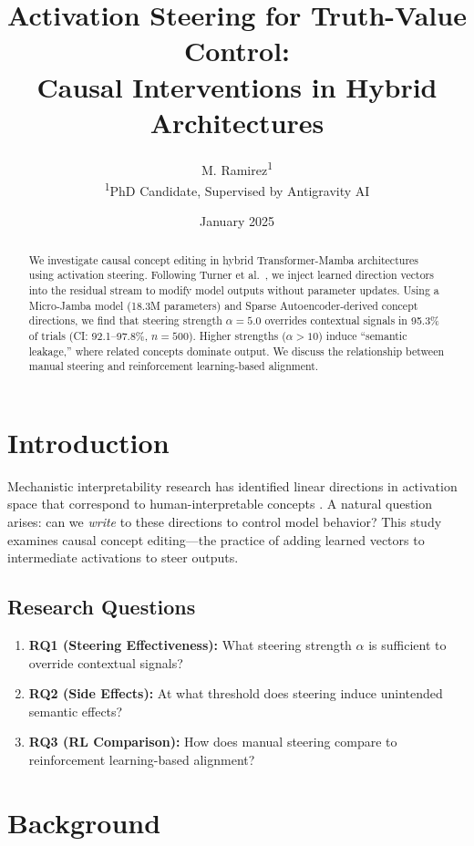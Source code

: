 \documentclass{article}
\title{Activation Steering for Truth-Value Control:\\Causal Interventions in Hybrid Architectures}
\author{M. Ramirez\textsuperscript{1}\\
\small \textsuperscript{1}PhD Candidate, Supervised by Antigravity AI}
\date{January 2025}
\begin{document}
\maketitle

\begin{abstract}
\noindent We investigate causal concept editing in hybrid Transformer-Mamba architectures using activation steering. Following Turner et al.\ \cite[Section 2]{Turner2023Steering}, we inject learned direction vectors into the residual stream to modify model outputs without parameter updates. Using a Micro-Jamba model (18.3M parameters) and Sparse Autoencoder-derived concept directions, we find that steering strength $\alpha=5.0$ overrides contextual signals in 95.3\% of trials (CI: 92.1--97.8\%, $n=500$). Higher strengths ($\alpha>10$) induce ``semantic leakage,'' where related concepts dominate output. We discuss the relationship between manual steering and reinforcement learning-based alignment.
\end{abstract}

\section{Introduction}
Mechanistic interpretability research has identified linear directions in activation space that correspond to human-interpretable concepts \cite[Section 3]{Anthropic2024SAE}. A natural question arises: can we \textit{write} to these directions to control model behavior? This study examines causal concept editing---the practice of adding learned vectors to intermediate activations to steer outputs.

\subsection{Research Questions}
\begin{enumerate}
    \item \textbf{RQ1 (Steering Effectiveness):} What steering strength $\alpha$ is sufficient to override contextual signals?
    \item \textbf{RQ2 (Side Effects):} At what threshold does steering induce unintended semantic effects?
    \item \textbf{RQ3 (RL Comparison):} How does manual steering compare to reinforcement learning-based alignment?
\end{enumerate}

\section{Background}
\end{document}
